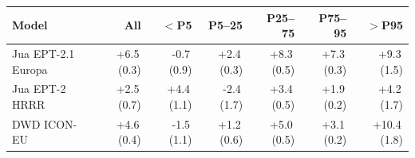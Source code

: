 \begin{tabular}{@{}lrrrrrr@{}}
\toprule
Model & All & $<$P5 & P5--25 & P25--75 & P75--95 & $>$P95 \\
\midrule
Jua EPT-2.1 Europa & +6.5\,(0.3) & -0.7\,(0.9) & +2.4\,(0.3) & +8.3\,(0.5) & +7.3\,(0.3) & +9.3\,(1.5) \\\addlinespace[0.35em]
Jua EPT-2 HRRR & +2.5\,(0.7) & +4.4\,(1.1) & -2.4\,(1.7) & +3.4\,(0.5) & +1.9\,(0.2) & +4.2\,(1.7) \\\addlinespace[0.35em]
DWD ICON-EU & +4.6\,(0.4) & -1.5\,(1.1) & +1.2\,(0.6) & +5.0\,(0.5) & +3.1\,(0.2) & +10.4\,(1.8) \\
\bottomrule
\end{tabular}
